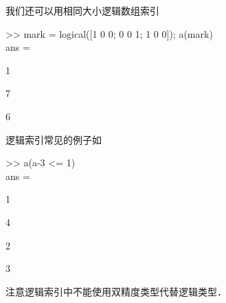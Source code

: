 我们还可以用相同大小逻辑数组索引
\begin{Command}
>> mark = logical([1 0 0; 0 0 1; 1 0 0]); a(mark) \\
ans = \par 1 \par 7 \par 6
\end{Command}
逻辑索引常见的例子如
\begin{Command}
>> a(a-3 <= 1) \\
ans = \par 1 \par 4 \par 2 \par 3
\end{Command}
注意逻辑索引中不能使用双精度类型代替逻辑类型．
